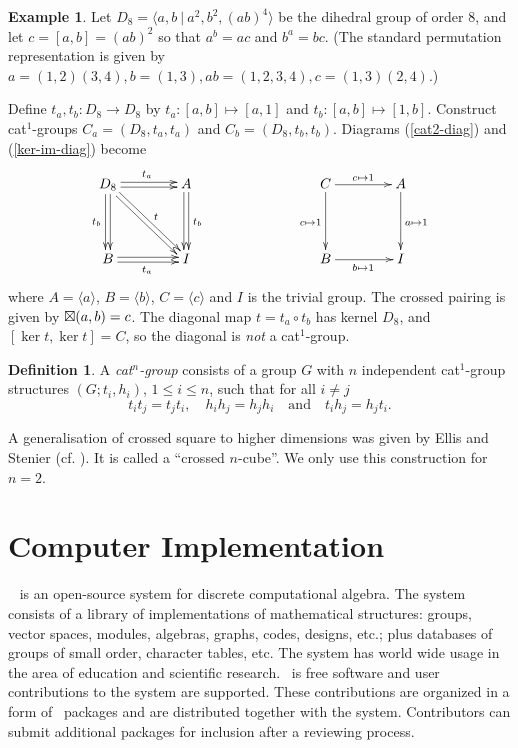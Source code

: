 \documentclass[a4paper,11pt]{article}
\theoremstyle{plain}
\theoremstyle{definition}
\newtheorem{definition}[theorem]{Definition}
\newtheorem{example}[theorem]{Example}
\begin{document}
\begin{example} \label{ex-d8} 
Let $D_8 = \langle a,b ~|~ a^2, b^2, (ab)^4 \rangle$ 
be the dihedral group of order $8$, 
and let $c=[a,b]=(ab)^2$ so that $a^b=ac$ and $b^a=bc$.  
(The standard permutation representation is given by 
$a=(1,2)(3,4), b=(1,3), ab=(1,2,3,4), c=(1,3)(2,4)$.) 

Define $t_a,t_b : D_8 \to D_8$ by $t_a : [a,b] \mapsto [a,1]$ 
and $t_b : [a,b] \mapsto [1,b]$. 
Construct cat$^1$-groups $C_a = (D_8,t_a,t_a)$ and $C_b = (D_8,t_b,t_b)$. 
Diagrams (\ref{cat2-diag}) and (\ref{ker-im-diag}) become 
\[
\xymatrix@R=40pt@C=40pt
{ D_8 \ar@<+0.4ex>[r]^{t_a} \ar@<-0.4ex>[r] 
    \ar@<-0.4ex>[d]_{t_b} \ar@<+0.4ex>[d] 
    \ar@<-0.4ex>[rd]^{\ t} \ar@<+0.4ex>[rd] 
	& A \ar@<+0.4ex>[d]^{t_b} \ar@<-0.4ex>[d] 
	   &  & C \ar[r]^{c \mapsto 1} \ar[d]_{c \mapsto 1}  
	         & A \ar[d]^{a \mapsto 1} \\
  B \ar@<-0.4ex>[r]_{t_a} \ar@<+0.4ex>[r] 
	& I 
	   &  & B \ar[r]_{b \mapsto 1}  
	         & I }
\] 
where $A = \langle a \rangle$, $B = \langle b \rangle$, $C = \langle c \rangle$ 
and $I$ is the trivial group. 
The crossed pairing is given by $\boxtimes(a,b)=c$. 
The diagonal map $t = t_a \circ t_b$ has kernel $D_8$, 
and $[\ker t,\ker t] = C$, so the diagonal is \emph{not} a cat$^1$-group. 
\end{example} 

\begin{definition}
A \emph{cat$^{n}$-group} consists of a group $G$ 
with $n$ independent cat$^{1}$-group structures $(G;t_{i},h_{i})$, 
$1 \leq i \leq n$, such that for all $i \ne j$ 
\[
t_{i}t_{j} = t_{j}t_{i}, \quad 
h_{i}h_{j} = h_{j}h_{i} \quad \mbox{and} \quad 
t_{i}h_{j} = h_{j}t_{i}. 
\]
\end{definition}

A generalisation of crossed square to higher dimensions was given by Ellis
and Stenier (cf. \cite{ellis-stenier}). 
It is called a \textquotedblleft crossed $n$-cube\textquotedblright. 
We only use this construction for $n=2$.


\section{Computer Implementation}

\GAP\ \cite{gap} is an open-source system for discrete computational
algebra. The system consists of a library of implementations of mathematical
structures: groups, vector spaces, modules, algebras, graphs, codes,
designs, etc.; plus databases of groups of small order, character tables, etc. 
The system has world wide usage in the area of education and scientific research. 
\GAP\ is free software and user contributions to the system are supported. 
These contributions are organized in a form of \GAP\ packages 
and are distributed together with the system.  Contributors can
submit additional packages for inclusion after a reviewing process.
\end{document}
